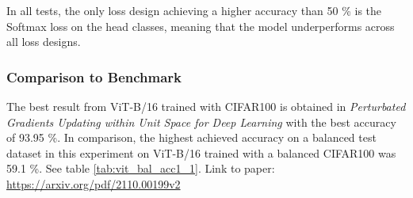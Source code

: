 In all tests, the only loss design achieving a higher accuracy than 50 \% is the Softmax loss on the head classes, meaning that the model underperforms across all loss designs.

\subsubsection{Comparison to Benchmark}
The best result from ViT-B/16 trained with CIFAR100 is obtained in \textit{Perturbated Gradients Updating within Unit Space for Deep Learning} \cite{Tseng_2022} with the best accuracy of 93.95 \%. In comparison, the highest achieved accuracy on a balanced test dataset in this experiment on ViT-B/16 trained with a balanced CIFAR100 was 59.1 \%. See table \ref{tab:vit_bal_acc1_1}. 
Link to paper: \url{https://arxiv.org/pdf/2110.00199v2}





